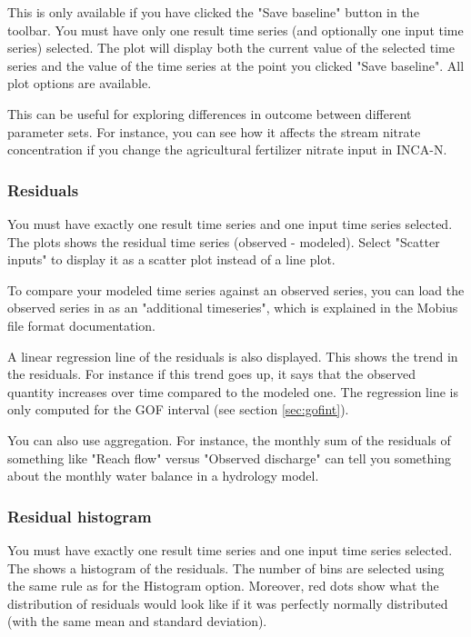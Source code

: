 \documentclass[11pt]{article}
\theoremstyle{definition}
\begin{document}
This is only available if you have clicked the "Save baseline" button in the toolbar. You must have only one result time series (and optionally one input time series) selected. The plot will display both the current value of the selected time series and the value of the time series at the point you clicked "Save baseline". All plot options are available.

This can be useful for exploring differences in outcome between different parameter sets. For instance, you can see how it affects the stream nitrate concentration if you change the agricultural fertilizer nitrate input in INCA-N.

\subsubsection{Residuals}

You must have exactly one result time series and one input time series selected. The plots shows the residual time series (observed - modeled). Select "Scatter inputs" to display it as a scatter plot instead of a line plot.

To compare your modeled time series against an observed series, you can load the observed series in as an "additional timeseries", which is explained in the Mobius file format documentation.

A linear regression line of the residuals is also displayed. This shows the trend in the residuals. For instance if this trend goes up, it says that the observed quantity increases over time compared to the modeled one. The regression line is only computed for the GOF interval (see section \ref{sec:gofint}).

You can also use aggregation. For instance, the monthly sum of the residuals of something like "Reach flow" versus "Observed discharge" can tell you something about the monthly water balance in a hydrology model.

\subsubsection{Residual histogram}

You must have exactly one result time series and one input time series selected. The shows a histogram of the residuals. The number of bins are selected using the same rule as for the Histogram option. Moreover, red dots show what the distribution of residuals would look like if it was perfectly normally distributed (with the same mean and standard deviation).
\end{document}
